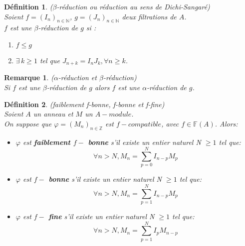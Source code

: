 \documentclass[12pt, a4paper, oneside]{article}
\newtheorem{maremarque}{Remarque}
\newtheorem{madefinition}{Définition}
\begin{document}
	\begin{madefinition}($\beta$-réduction ou réduction au sens de Dichi-Sangaré)\\
		Soient $f = (I_n)_{n \in \mathbb{N}}$, $g = (J_n)_{n \in \mathbb{N}}$ deux filtrations de $A$.\\
		$f$ est une $\beta$-réduction de $g$ si : \\
		\begin{enumerate}
			\item[i)] $f \leq g$
			\item[ii)]  $\exists \, k \geq 1$ tel que $J_{n+k} = I_n J_k , \forall n \geq k$.
		\end{enumerate}
	\end{madefinition}
	\begin{maremarque}($\alpha$-réduction et $\beta$-réduction)\\
		Si $f$ est une $\beta$-réduction de $g$ alors $f$ est une $\alpha$-réduction de $g$.
	\end{maremarque}
	\begin{madefinition} (faiblement f-bonne, f-bonne et f-fine) \\
		\label{maprop11}
		Soient $A$ un anneau et $M$ un $A-module$.\\
		On suppose que $\varphi=(M_n)_{n \in \mathbb{Z}}$ est $f-compatible$, avec $f \in \mathbb{F}(A)$. Alors:
		\begin{itemize}
			\item[(a)] $\varphi$ est \textbf{faiblement $f-$ bonne} s'il existe un entier naturel N $\geqslant 1$ tel que:
			\[\forall n > N, M_{n}=\sum_{p=0}^{N}I_{n-p}M_{p} \]
			\item[(b)] $\varphi$ est \textbf{$f-$ bonne} s'il existe un entier naturel N $\geqslant 1$ tel que:
			\[\forall n > N, M_{n}=\sum_{p=1}^{N}I_{n-p}M_{p} \]
			\item[(c)] $\varphi$ est \textbf{$f-$ fine} s'il existe un entier naturel N $\geqslant 1$ tel que:
			\[\forall n > N, M_{n}=\sum_{p=1}^{N}I_{p}M_{n-p} \]
		\end{itemize} 
	\end{madefinition}
\end{document}
